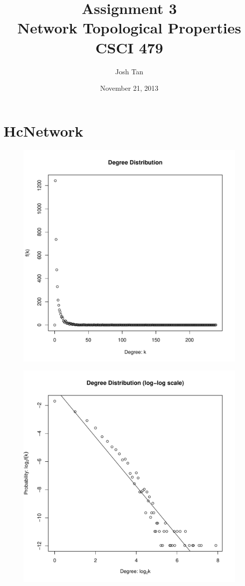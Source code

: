 \documentclass{report}
\title{Assignment 3\\Network Topological Properties\\[1em]CSCI 479}
\author{Josh Tan}
\date{November 21, 2013}
\begin{document}
\maketitle

\section*{HcNetwork}

\begin{figure}[htp!]
  \centering
  \includegraphics[width=0.65\linewidth]{HcNetwork}
\end{figure}
\vspace{-2em}
\begin{figure}[htp!]
  \centering
  \includegraphics[width=0.65\linewidth]{HcNetworkLog}
\end{figure}
\end{document}
